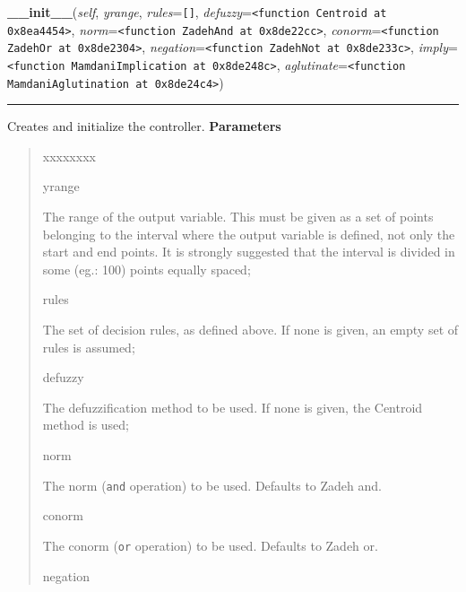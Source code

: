     \vspace{0.5ex}

\hspace{.8\funcindent}\begin{boxedminipage}{\funcwidth}

    \raggedright \textbf{\_\_init\_\_}(\textit{self}, \textit{yrange}, \textit{rules}={\tt \texttt{[}\texttt{]}}, \textit{defuzzy}={\tt {\textless}function Centroid at 0x8ea4454{\textgreater}}, \textit{norm}={\tt {\textless}function ZadehAnd at 0x8de22cc{\textgreater}}, \textit{conorm}={\tt {\textless}function ZadehOr at 0x8de2304{\textgreater}}, \textit{negation}={\tt {\textless}function ZadehNot at 0x8de233c{\textgreater}}, \textit{imply}={\tt {\textless}function MamdaniImplication at 0x8de248c{\textgreater}}, \textit{aglutinate}={\tt {\textless}function MamdaniAglutination at 0x8de24c4{\textgreater}})

    \vspace{-1.5ex}

    \rule{\textwidth}{0.5\fboxrule}
\setlength{\parskip}{2ex}

Creates and initialize the controller.
\setlength{\parskip}{1ex}
      \textbf{Parameters}
      \vspace{-1ex}

      \begin{quote}
        \begin{Ventry}{xxxxxxxx}

          \item[yrange]


The range of the output variable. This must be given as a set of
points belonging to the interval where the output variable is
defined, not only the start and end points. It is strongly suggested
that the interval is divided in some (eg.: 100) points equally
spaced;
          \item[rules]


The set of decision rules, as defined above. If none is given, an
empty set of rules is assumed;
          \item[defuzzy]


The defuzzification method to be used. If none is given, the
Centroid method is used;
          \item[norm]


The norm (\texttt{and} operation) to be used. Defaults to Zadeh and.
          \item[conorm]


The conorm (\texttt{or} operation) to be used. Defaults to Zadeh or.
          \item[negation]



\end{Ventry}
\end{quote}
\end{boxedminipage}
